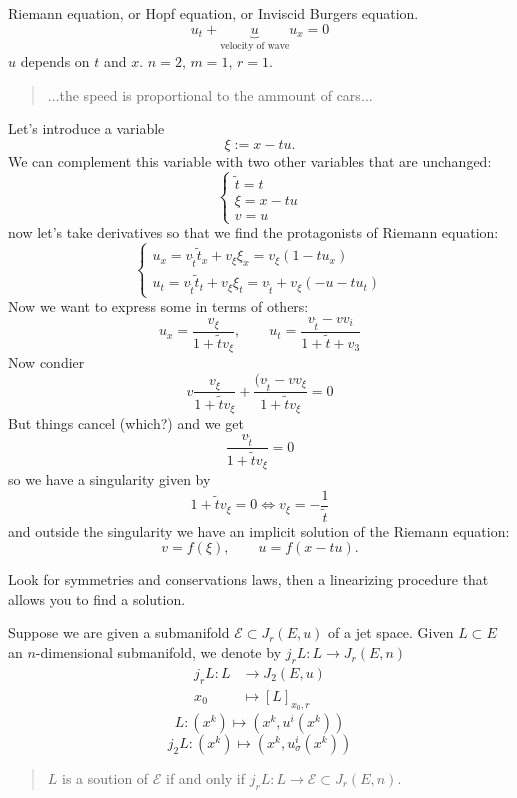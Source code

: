 \begin{example}
\label{example-wdvv-riemann}
Riemann equation, or Hopf equation, or
Inviscid Burgers equation.
$$u_t+\underbrace{u}_{\text{velocity of wave}
} u_x=0$$
$u$ depends on $t$ and $x$. $n=2$,  $m=1$,
$r=1$.

\begin{quotation}
$\ldots$the speed is proportional to the
ammount of cars$\ldots$
\end{quotation}
Let's introduce a variable
$$\xi:=x-tu.$$
We can complement this variable with two
other variables that are unchanged:
$$
\begin{cases}
\tilde{t}=t\\
\xi=x-tu\\
v=u
\end{cases}
$$
now let's take derivatives so that we find
the protagonists of Riemann equation:
$$
\begin{cases}
u_x=v_{\tilde{t}}\tilde{t}_x+v_\xi
\xi_x=v_\xi(1-tu_x)\\
u_t=v_{\tilde{t}}\tilde{t}_t+v_\xi
\xi_t=v_{\tilde{t}}+v_\xi(-u-tu_t)
\end{cases}
$$
Now we want to express some in terms of
others:
$$u_x=\frac{v_\xi}{1+\tilde{t}v_\xi},\qquad
u_t=\frac{v_{\tilde{t}}-v
v_i}{1+\tilde{t}+v_3}$$
Now condier
$$v\frac{v_\xi}{1+\tilde{t}v_\xi}+
\frac{(v_{\tilde{t}}-v
v_\xi}{1+\tilde{t}v_\xi}=0$$
But things cancel (which?) and we get
$$\frac{v_{\tilde{t}}}{1+\tilde{t}v_\xi}=0$$
so we have a singularity given by
$$1+\tilde{t}v_\xi=0 \iff
v_\xi=-\frac{1}{\tilde{t}}$$
and outside the singularity we have an
implicit solution of the Riemann equation:
$$v=f(\xi),\qquad u=f(x-tu).$$
\end{example}

\medskip{}
Look for symmetries and conservations laws,
then a linearizing procedure that allows you
to find a solution.

\medskip{}
Suppose we are given a submanifold
$\mathcal{E} \subset J_r(E,u)$ of a jet
space. Given $L \subset E$ an $n$-dimensional
submanifold, we denote by $j_rL: L \to
J_r(E,n)$
$$
\begin{aligned}
j_rL: L &\longrightarrow J_2(E,u) \\
x_0 &\longmapsto [L]_{x_0,r}
\end{aligned}
$$
$$L:(x^k)\mapsto (x^k,u^i(x^k))$$
$$j_2L:(x^k)\mapsto (x^k,u^i_\sigma(x^k))$$

\begin{quotation}
$L$ is a soution of $\mathcal{E}$ if and only
if $j_rL:L \to \mathcal{E} \subset J_r(E,n)$.
\end{quotation}


